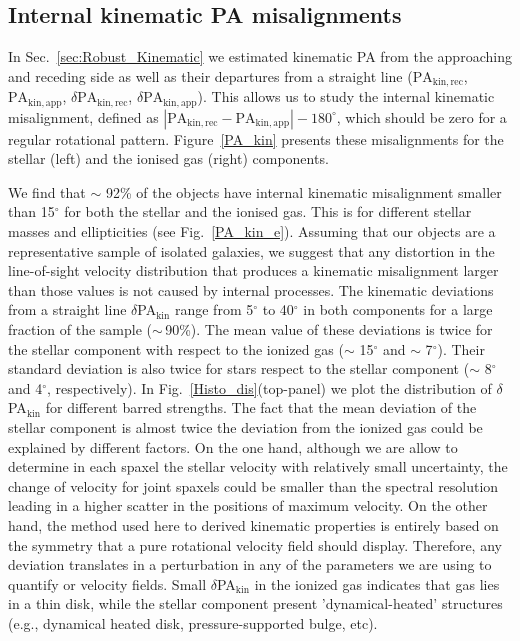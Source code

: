 \documentclass[longauth,traditabstract]{aa}
\begin{document}
\subsection{Internal kinematic PA misalignments}
\label{sec:int_kin}

In Sec.~\ref{sec:Robust_Kinematic} we estimated kinematic PA from the approaching
and receding side as well as their departures from a straight line
($\mathrm{PA_{kin,rec}}$, $\mathrm{PA_{kin,app}}$,
$\delta\mathrm{PA_{kin,rec}}$, $\delta\mathrm{PA_{kin,app}}$). This allows us to
study the internal kinematic misalignment, defined as $|\mathrm{PA_{kin,rec}}-\mathrm{PA_{kin,app}}|-180^\circ$, which should be zero for a regular rotational pattern. Figure~\ref{PA_kin} presents these misalignments for
the stellar (left) and the ionised gas (right) components.

We find that $\sim$ 92\% of the objects have internal kinematic misalignment smaller
than 15$^\circ$ for both the stellar and the ionised gas. This is for different stellar masses and ellipticities (see Fig.~\ref{PA_kin_e}). Assuming that our objects are a representative sample of isolated galaxies, we suggest that any distortion in the line-of-sight velocity distribution that produces a kinematic misalignment larger than those values is not caused by internal processes. The kinematic deviations from a straight line $\delta$PA$_{\mathrm{kin}}$ range from 5$^\circ$ to  40$^\circ$  in both  components for a large fraction of the sample ($\sim$\,90\%). The mean value of these deviations is twice for the stellar component with respect to the ionized gas ($\sim$ 15$^\circ$ and $\sim$ 7$^\circ$). Their standard deviation is also twice for stars respect to the stellar component ($\sim$ 8$^\circ$ and 4$^\circ$, respectively). In Fig.~\ref{Histo_dis}(top-panel) we plot the distribution of  $\delta$PA$_{\mathrm{kin}}$ for different barred strengths.  The fact that the mean deviation of the stellar component is almost twice the deviation from the ionized gas could be explained by different factors. On the one hand, although we are allow to determine in each spaxel the stellar velocity with relatively small uncertainty, the change of velocity for joint spaxels could be smaller than the spectral resolution leading in a higher scatter in the positions of maximum velocity. On the other hand,  the method used here to derived kinematic properties is entirely based on the symmetry that a pure rotational velocity field should display. Therefore, any deviation translates in a perturbation in any of the parameters we are using to quantify or velocity fields. Small $\delta$PA$_{\mathrm{kin}}$ in the ionized gas indicates that gas lies in a thin disk, while the stellar component present 'dynamical-heated' structures (e.g., dynamical heated disk, pressure-supported bulge, etc).
\end{document}
